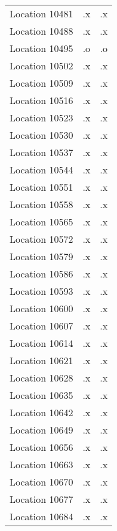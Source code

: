 \begin{tabular}{l*{2}{c}}
Location 10481      &          .x&          .x\\
Location 10488      &          .x&          .x\\
Location 10495      &          .o&          .o\\
Location 10502      &          .x&          .x\\
Location 10509      &          .x&          .x\\
Location 10516      &          .x&          .x\\
Location 10523      &          .x&          .x\\
Location 10530      &          .x&          .x\\
Location 10537      &          .x&          .x\\
Location 10544      &          .x&          .x\\
Location 10551      &          .x&          .x\\
Location 10558      &          .x&          .x\\
Location 10565      &          .x&          .x\\
Location 10572      &          .x&          .x\\
Location 10579      &          .x&          .x\\
Location 10586      &          .x&          .x\\
Location 10593      &          .x&          .x\\
Location 10600      &          .x&          .x\\
Location 10607      &          .x&          .x\\
Location 10614      &          .x&          .x\\
Location 10621      &          .x&          .x\\
Location 10628      &          .x&          .x\\
Location 10635      &          .x&          .x\\
Location 10642      &          .x&          .x\\
Location 10649      &          .x&          .x\\
Location 10656      &          .x&          .x\\
Location 10663      &          .x&          .x\\
Location 10670      &          .x&          .x\\
Location 10677      &          .x&          .x\\
Location 10684      &          .x&          .x\\

\end{tabular}
